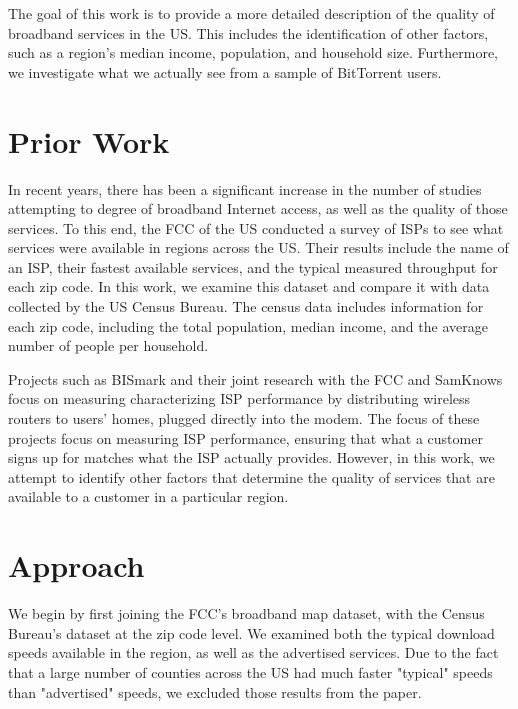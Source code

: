 \documentclass{sig-alternate-10pt}
\begin{document}
The goal of this work is to provide a more detailed description of the quality
of broadband services in the US.  This includes the identification of other
factors, such as a region's median income, population, and household size.
Furthermore, we investigate what we actually see from a sample of BitTorrent
users.  



\section{Prior Work}
\label{sec:prior-work}

In recent years, there has been a significant increase in the number of studies
attempting to degree of broadband Internet access, as well as the quality 
of those services.  To this end, the FCC of the US conducted a survey of ISPs
to see what services were available in regions across the US.  Their results
include the name of an ISP, their fastest available services, and the 
typical measured throughput for each zip code.  In this work, we examine this 
dataset and compare it with data collected by the US Census Bureau. The census
data includes information for each zip code, including the total population,
median income, and the average number of people per household.

Projects such as BISmark and their joint research with the FCC and SamKnows
focus on measuring characterizing ISP performance by distributing wireless
routers to users' homes, plugged directly into the modem. The focus of these
projects focus on measuring ISP performance, ensuring that what a customer
signs up for matches what the ISP actually provides.  However, in this work,
we attempt to identify other factors that determine the quality of services 
that are available to a customer in a particular region.
 

\section{Approach}
\label{sec:approach} 

We begin by first joining the FCC's broadband map dataset, with the Census
Bureau's dataset at the zip code level. We examined both the typical download
speeds available in the region, as well as the advertised services.  Due to the
fact that a large number of counties across the US had much faster "typical"
speeds than "advertised" speeds, we excluded those results from the paper. 
\end{document}

